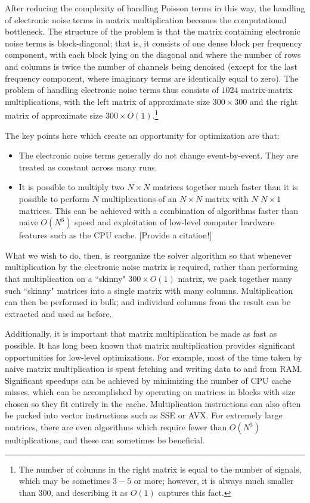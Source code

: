 After reducing the complexity of handling Poisson terms in this way, the handling of electronic noise terms in matrix multiplication becomes the computational bottleneck.  The structure of the problem is that the matrix containing electronic noise terms is block-diagonal; that is, it consists of one dense block per frequency component, with each block lying on the diagonal and where the number of rows and columns is twice the number of channels being denoised (except for the last frequency component, where imaginary terms are identically equal to zero).  The problem of handling electronic noise terms thus consists of $1024$ matrix-matrix multiplications, with the left matrix of approximate size $300\times300$ and the right matrix of approximate size $300\times O(1)$.\footnote{The number of columns in the right matrix is equal to the number of signals, which may be sometimes $3-5$ or more; however, it is always much smaller than $300$, and describing it as $O(1)$ captures this fact.}

The key points here which create an opportunity for optimization are that:
\begin{itemize}
\item The electronic noise terms generally do not change event-by-event.  They are treated as constant across many runs.
\item It is possible to multiply two $N \times N$ matrices together much faster than it is possible to perform $N$ multiplications of an $N \times N$ matrix with $N$ $N \times 1$ matrices.  This can be achieved with a combination of algorithms faster than naive $O(N^3)$ speed and exploitation of low-level computer hardware features such as the CPU cache. [Provide a citation!]
\end{itemize}
What we wish to do, then, is reorganize the solver algorithm so that whenever multiplication by the electronic noise matrix is required, rather than performing that multiplication on a ``skinny" $300 \times O(1)$ matrix, we pack together many such ``skinny" matrices into a single matrix with many columns.  Multiplication can then be performed in bulk; and individual columns from the result can be extracted and used as before.

Additionally, it is important that matrix multiplication be made as fast as possible.  It has long been known that matrix multiplication provides significant opportunities for low-level optimizations. For example, most of the time taken by naive matrix multiplication is spent fetching and writing data to and from RAM.  Significant speedups can be achieved by minimizing the number of CPU cache misses, which can be accomplished by operating on matrices in blocks with size chosen so they fit entirely in the cache.  Multiplication instructions can also often be packed into vector instructions such as SSE or AVX.  For extremely large matrices, there are even algorithms which require fewer than $O(N^3)$ multiplications, and these can sometimes be beneficial.

